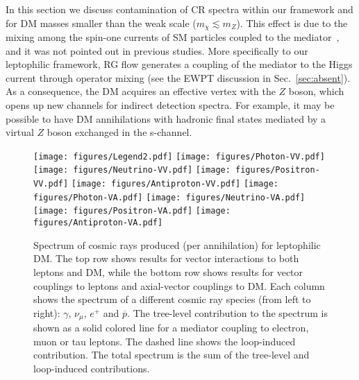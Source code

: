 \documentclass[final,5p,twocolumn]{elsarticle}
\begin{document}
In this section we discuss contamination of CR spectra within our framework and for DM masses smaller than the weak scale  ($m_\chi \lesssim m_{Z}$). This effect is due to the mixing among the spin-one currents of SM particles coupled to the mediator~\cite{D'Eramo:2014aba}, and it was not pointed out in previous studies. More specifically to our leptophilic framework, RG flow generates a coupling of the mediator to the Higgs current through operator mixing (see the EWPT discussion in Sec.~\ref{sec:absent}). As a consequence, the DM acquires an effective vertex with the $Z$ boson, which opens up new channels for indirect detection spectra. For example, it may be possible to have DM annihilations with hadronic final states mediated by a virtual $Z$ boson exchanged in the s-channel. 

\begin{figure*}[t!]
\centering
\hspace{0.75cm}\texttt{[image: figures/Legend2.pdf]}
{\texttt{[image: figures/Photon-VV.pdf]}}
{\texttt{[image: figures/Neutrino-VV.pdf]}}
{\texttt{[image: figures/Positron-VV.pdf]}}
{\texttt{[image: figures/Antiproton-VV.pdf]}}
{\texttt{[image: figures/Photon-VA.pdf]}}
{\texttt{[image: figures/Neutrino-VA.pdf]}}
{\texttt{[image: figures/Positron-VA.pdf]}}
{\texttt{[image: figures/Antiproton-VA.pdf]}}
\caption{Spectrum of cosmic rays produced (per annihilation) for leptophilic DM. The top row shows results for vector interactions to both leptons and DM, while the bottom row shows results for vector couplings to leptons and axial-vector couplings to DM. Each column shows the spectrum of a different cosmic ray species (from left to right): $\gamma$, $\nu_\mu$, $e^+$ and $\overline{p}$. The tree-level contribution to the spectrum is shown as a solid colored line for a mediator coupling to electron, muon or tau leptons. The dashed line shows the loop-induced contribution. The total spectrum is the sum of the tree-level and loop-induced contributions.}
\label{fig:spectra}
\end{figure*}
\end{document}
